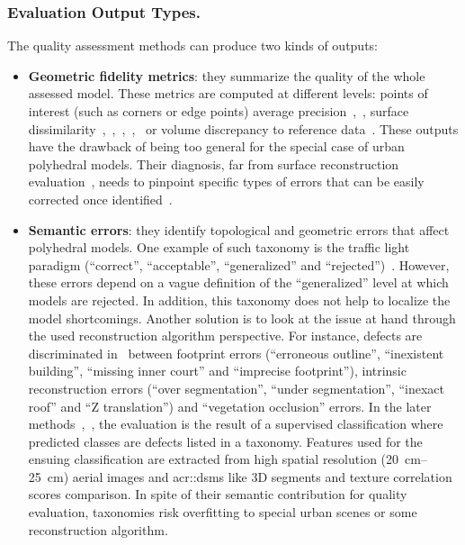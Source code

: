 \documentclass[runningheads]{llncs}
\begin{document}
\subsubsection{Evaluation Output Types.}
The quality assessment methods can produce two kinds of outputs:
\begin{itemize}
    \item \textbf{Geometric fidelity metrics}: they summarize the quality of the whole assessed model. These metrics are computed at different levels: points of interest (such as corners or edge points) average precision~\cite{Kaartinen2005},~\cite{vogtle2003quality}, surface dissimilarity~\cite{Kaartinen2005},~\cite{Henricsson1997},~\cite{Zeng2014},~\cite{lafarge2012creating},~\cite{li2016boxfitting} or volume discrepancy to reference data~\cite{Zeng2014}. These outputs have the drawback of being too general for the special case of urban polyhedral models. Their diagnosis, far from surface reconstruction evaluation~\cite{berger2013benchmark}, needs to pinpoint specific types of errors that can be easily corrected once identified~\cite{OudeElberink2010}.
    \item \textbf{Semantic errors}: they identify topological and geometric errors that affect polyhedral models. One example of such taxonomy is the traffic light paradigm (``correct'', ``acceptable'', ``generalized'' and ``rejected'')~\cite{boudet2006supervised}. However, these errors depend on a vague definition of the ``generalized'' level at which models are rejected. In addition, this taxonomy does not help to localize the model shortcomings. Another solution is to look at the issue at hand through the used reconstruction algorithm perspective. For instance, defects are discriminated in~\cite{Michelin2013} between footprint errors (``erroneous outline'', ``inexistent building'', ``missing inner court'' and ``imprecise footprint''), intrinsic reconstruction errors (``over segmentation'', ``under segmentation'', ``inexact roof'' and ``Z translation'') and ``vegetation occlusion'' errors. In the later methods~\cite{boudet2006supervised},~\cite{Michelin2013}, the evaluation is the result of a supervised classification where predicted classes are defects listed in a taxonomy. Features used for the ensuing classification are extracted from high spatial resolution (\SIrange{20}{25}{\cm}) aerial images and \glspl{acr::dsm} like 3D segments and texture correlation scores comparison. In spite of their semantic contribution for quality evaluation, taxonomies risk overfitting to special urban scenes or some reconstruction algorithm.
\end{itemize}
\end{document}
